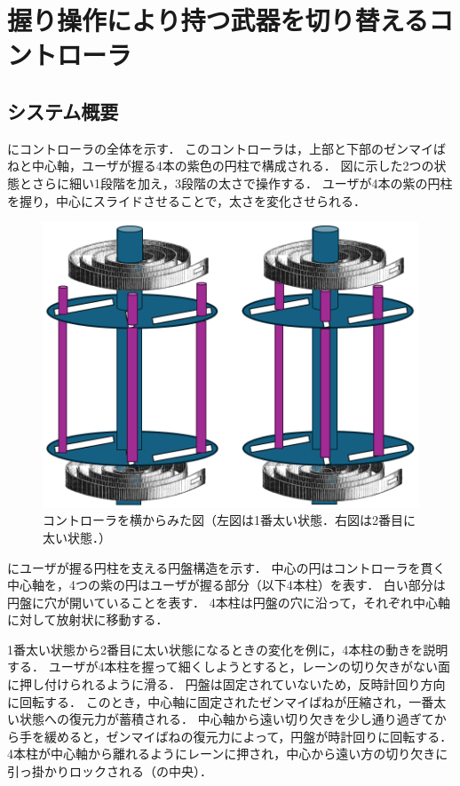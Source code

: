 \documentclass[uplatex]{jsarticle}
\begin{document}
\section{握り操作により持つ武器を切り替えるコントローラ}

\subsection{システム概要}

にコントローラの全体を示す．
このコントローラは，上部と下部のゼンマイばねと中心軸，ユーザが握る4本の紫色の円柱で構成される．
図に示した2つの状態とさらに細い1段階を加え，3段階の太さで操作する．
ユーザが4本の紫の円柱を握り，中心にスライドさせることで，太さを変化させられる．

\begin{figure}[htbp]
    \centering
    \includegraphics[width=0.7\linewidth]{fig/横からみた図.png}
    \caption{コントローラを横からみた図（左図は1番太い状態．右図は2番目に太い状態．）}
    \label{fig:Zentai}
\end{figure}

にユーザが握る円柱を支える円盤構造を示す．
中心の円はコントローラを貫く中心軸を，4つの紫の円はユーザが握る部分（以下4本柱）を表す．
白い部分は円盤に穴が開いていることを表す．
4本柱は円盤の穴に沿って，それぞれ中心軸に対して放射状に移動する．

1番太い状態から2番目に太い状態になるときの変化を例に，4本柱の動きを説明する．
ユーザが4本柱を握って細くしようとすると，レーンの切り欠きがない面に押し付けられるように滑る．
円盤は固定されていないため，反時計回り方向に回転する．
このとき，中心軸に固定されたゼンマイばねが圧縮され，一番太い状態への復元力が蓄積される．
中心軸から遠い切り欠きを少し通り過ぎてから手を緩めると，ゼンマイばねの復元力によって，円盤が時計回りに回転する．
4本柱が中心軸から離れるようにレーンに押され，中心から遠い方の切り欠きに引っ掛かりロックされる（の中央）．
\end{document}
